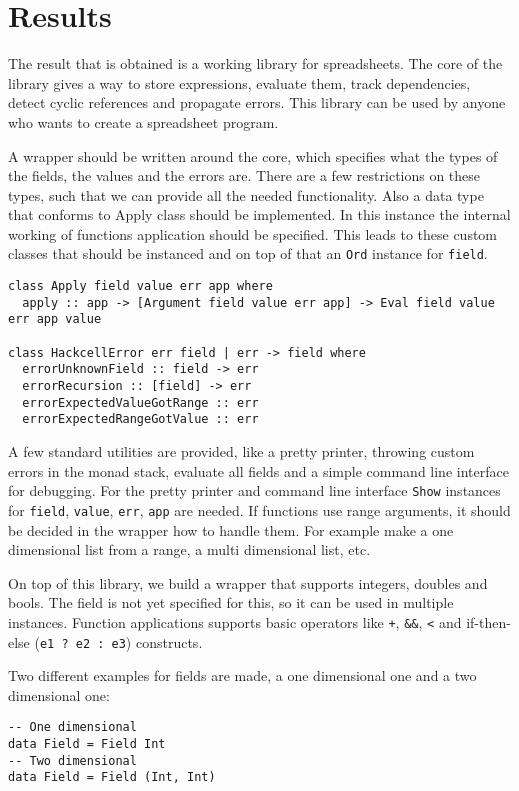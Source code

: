 \documentclass{article}
\begin{document}
	\section{Results}
	The result that is obtained is a working library for spreadsheets. The core of the library gives a way to store expressions, evaluate them, track dependencies, detect cyclic references and propagate errors. This library can be used by anyone who wants to create a spreadsheet program.

	A wrapper should be written around the core, which specifies what the types of the fields, the values and the errors are. There are a few restrictions on these types, such that we can provide all the needed functionality. Also a data type that conforms to Apply class should be implemented. In this instance the internal working of functions application should be specified. This leads to these custom classes that should be instanced and on top of that an \texttt{Ord} instance for \texttt{field}.
\begin{verbatim}
class Apply field value err app where
  apply :: app -> [Argument field value err app] -> Eval field value err app value
  
class HackcellError err field | err -> field where
  errorUnknownField :: field -> err
  errorRecursion :: [field] -> err
  errorExpectedValueGotRange :: err
  errorExpectedRangeGotValue :: err
\end{verbatim}
	
	A few standard utilities are provided, like a pretty printer, throwing custom errors in the monad stack, evaluate all fields and a simple command line interface for debugging. For the pretty printer and command line interface \texttt{Show} instances for \texttt{field}, \texttt{value}, \texttt{err}, \texttt{app} are needed. If functions use range arguments, it should be decided in the wrapper how to handle them. For example make a one dimensional list from a range, a multi dimensional list, etc.
	
	On top of this library, we build a wrapper that supports integers, doubles and bools. The field is not yet specified for this, so it can be used in multiple instances. Function applications supports basic operators like \texttt{+}, \texttt{\&\&}, \texttt{<} and if-then-else (\texttt{e1 ? e2 : e3}) constructs.
	
	Two different examples for fields are made, a one dimensional one and a two dimensional one:
\begin{verbatim}
-- One dimensional
data Field = Field Int
-- Two dimensional
data Field = Field (Int, Int)
\end{verbatim}
	
\end{document}
